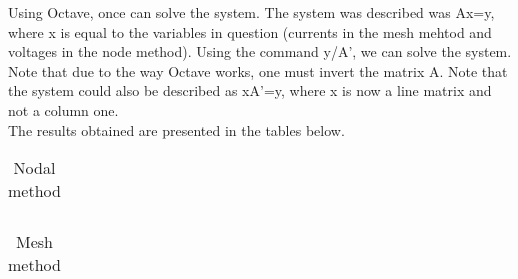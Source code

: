 Using Octave, once can solve the system. The system was described was Ax=y, where x is equal to the variables in question (currents in the mesh mehtod and voltages in the node method). Using the command y/A', we can solve the system. Note that due to the way Octave works, one must invert the matrix A. Note that the system could also be described as xA'=y, where x is now a line matrix and not a column one.\\
The results obtained are presented in the tables below.

\begin{table}[h]
  \centering
  \begin{tabular}{|c|c|c|c|c|c|c|}
    \hline    
    
    \hline
  \end{tabular}
  \caption{Nodal method}
  \label{tab:nodal}
\end{table}


\begin{table}[h]
  \centering
  \begin{tabular}{|c|c|c|c|}
    \hline    
    
    \hline
  \end{tabular}
  \caption{Mesh method}
  \label{tab:mesh}
\end{table}

